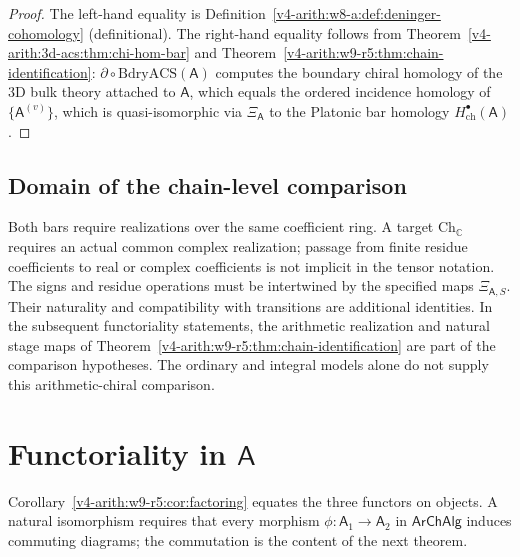 \begin{proof}
The left-hand equality is
Definition~\ref{v4-arith:w8-a:def:deninger-cohomology} (definitional). The
right-hand equality follows from
Theorem~\ref{v4-arith:3d-acs:thm:chi-hom-bar} and
Theorem~\ref{v4-arith:w9-r5:thm:chain-identification}:
\(\partial\circ\mathrm{BdryACS}(\mathsf{A})\) computes the boundary
chiral homology of the 3D bulk theory attached to \(\mathsf{A}\),
which equals the ordered incidence homology of \(\{\mathsf{A}^{(v)}\}\),
which is quasi-isomorphic via \(\Xi_{\mathsf{A}}\) to the Platonic bar
homology \(H^{\bullet}_{\mathrm{ch}}(\mathsf{A})\).
\end{proof}

\subsection*{Domain of the chain-level comparison}
\label{v4-arith:w9-r5:ah:chain}
Both bars require realizations over the same coefficient ring.
A target \(\mathrm{Ch}_{\mathbb C}\) requires an actual common complex
realization; passage from finite residue coefficients to real or
complex coefficients is not implicit in the tensor notation.
The signs and residue operations must be intertwined by the specified
maps \(\Xi_{\mathsf A,S}\). Their naturality and compatibility with
transitions are additional identities. In the subsequent functoriality
statements, the arithmetic realization and natural stage maps of
Theorem~\ref{v4-arith:w9-r5:thm:chain-identification} are part of the
comparison hypotheses. The ordinary and integral models alone do not
supply this arithmetic-chiral comparison.

\section{Functoriality in \(\mathsf{A}\)}
\label{v4-arith:w9-r5:functoriality-A}

Corollary~\ref{v4-arith:w9-r5:cor:factoring} equates the three functors on
objects. A natural isomorphism requires that every morphism
\(\phi\colon\mathsf{A}_{1}\to\mathsf{A}_{2}\) in \(\mathsf{ArChAlg}\)
induces commuting diagrams; the commutation is the content of the
next theorem.

